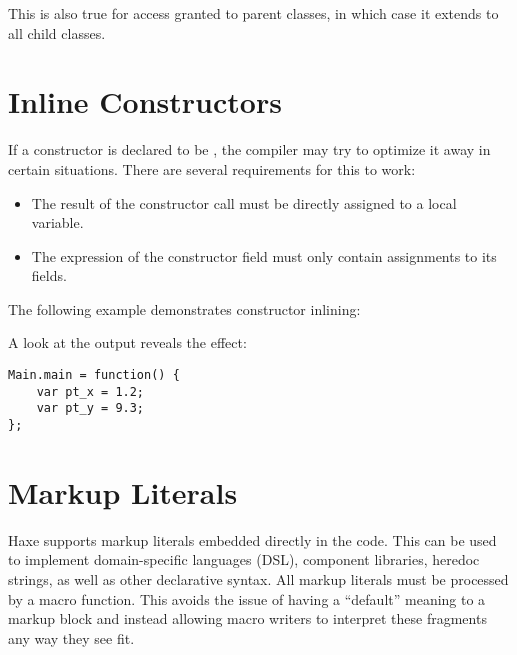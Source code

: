 
This is also true for access granted to parent classes, in which case it extends to all child classes.



\section{Inline Constructors}
\label{lf-inline-constructor}

If a constructor is declared to be , the compiler may try to optimize it away in certain situations. There are several requirements for this to work:

\begin{itemize}
	\item The result of the constructor call must be directly assigned to a local variable.
	\item The expression of the constructor field must only contain assignments to its fields.
\end{itemize}

The following example demonstrates constructor inlining:


A look at the  output reveals the effect:

\begin{lstlisting}
Main.main = function() {
	var pt_x = 1.2;
	var pt_y = 9.3;
};
\end{lstlisting}


\section{Markup Literals}
\label{lf-markup}

Haxe supports markup literals embedded directly in the code. This can be used to implement domain-specific languages (DSL), component libraries, heredoc strings, as well as other declarative syntax. All markup literals must be processed by a macro function. This avoids the issue of having a ``default'' meaning to a markup block and instead allowing macro writers to interpret these fragments any way they see fit.

